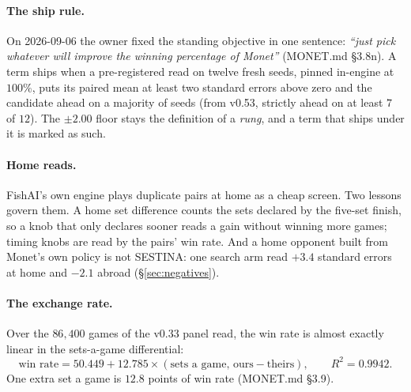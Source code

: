 \documentclass[11pt]{article}
\newcommand{\monet}{MONET.md}
\newcommand{\sect}[1]{\S#1}
\begin{document}
\paragraph{The ship rule.} On 2026-09-06 the owner fixed the standing objective in one sentence:
\emph{``just pick whatever will improve the winning percentage of Monet''} (\monet{} \sect{3.8n}). A
term ships when a pre-registered read on twelve fresh seeds, pinned in-engine at $100\%$, puts its paired
mean at least two standard errors above zero and the candidate ahead on a majority of seeds (from v0.53,
strictly ahead on at least $7$ of $12$). The $\pm 2.00$ floor stays the definition of a \emph{rung}, and
a term that ships under it is marked as such.

\paragraph{Home reads.} FishAI's own engine plays duplicate pairs at home as a cheap screen. Two lessons
govern them. A home set difference counts the sets declared by the five-set finish, so a knob that only
declares sooner reads a gain without winning more games; timing knobs are read by the pairs' win rate.
And a home opponent built from Monet's own policy is not SESTINA: one search arm read $+3.4$ standard
errors at home and $-2.1$ abroad (\sect\ref{sec:negatives}).

\paragraph{The exchange rate.} Over the $86{,}400$ games of the v0.33 panel read, the win rate is
almost exactly linear in the sets-a-game differential:
\[
  \text{win rate} = 50.449 + 12.785 \times (\text{sets a game, ours} - \text{theirs}), \qquad R^2 = 0.9942 .
\]
One extra set a game is $12.8$ points of win rate (\monet{} \sect{3.9}).
\end{document}
